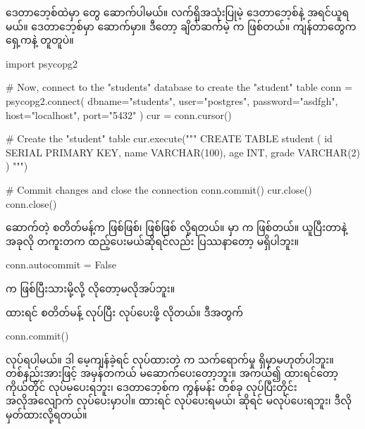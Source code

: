 ဒေတာဘေ့စ်ထဲမှာ  တွေ ဆောက်ပါမယ်။ လက်ရှိအသုံးပြုမဲ့ ဒေတာဘေ့စ်နဲ့  အရင်ယူရမယ်။  ဒေတာဘေ့စ်မှာ   ဆောက်မှာ။ ဒီတော့ ချိတ်ဆက်မဲ့  က  ဖြစ်တယ်။ ကျန်တာတွေက ရှေ့ကနဲ့ တူတူပဲ။
%
\begin{py}
import psycopg2

# Now, connect to the "students" database to create the "student" table
conn = psycopg2.connect(
    dbname="students",
    user="postgres",
    password="asdfgh",
    host="localhost",
    port="5432"
)
cur = conn.cursor()

# Create the "student" table
cur.execute("""
    CREATE TABLE student (
        id SERIAL PRIMARY KEY,
        name VARCHAR(100),
        age INT,
        grade VARCHAR(2)
    )
""")

# Commit changes and close the connection
conn.commit()
cur.close()
conn.close()
\end{py}
%

 ဆောက်တဲ့  စတိတ်မန့်က    ဖြစ်ဖြစ်၊  ဖြစ်ဖြစ်  လို့ရတယ်။  မှာ  က  ဖြစ်တယ်။  ယူပြီးတာနဲ့ အခုလို တကူးတက ထည့်ပေးမယ်ဆိုရင်လည်း ပြဿနာတော့ မရှိပါဘူး။ 
%
\begin{py}
conn.autocommit = False
\end{py}
%
 က  ဖြစ်ပြီးသားမို့လို့ လိုတော့မလိုအပ်ဘူး။

  ထားရင်  စတိတ်မန့်  လုပ်ပြီး  လုပ်ပေးဖို့ လိုတယ်။ ဒီအတွက်
%
\begin{py}
conn.commit()
\end{py}
%
လုပ်ရပါမယ်။ ဒါ မေ့ကျန်ခဲ့ရင်  လုပ်ထားတဲ့  က သက်ရောက်မှု ရှိမှာမဟုတ်ပါဘူး။ တစ်နည်းအားဖြင့်  အမှန်တကယ် မဆောက်ပေးတော့ဘူး။ အကယ်၍   ထားရင်တော့ ကိုယ်တိုင်  လုပ်မပေးရဘူး၊ ဒေတာဘေ့စ်က  ကွန်မန်း တစ်ခု  လုပ်ပြီးတိုင်း အလိုအလျောက်  လုပ်ပေးမှာပါ။  ထားရင်  လုပ်ပေးရမယ်၊  ဆိုရင် မလုပ်ပေးရဘူး၊ ဒီလို မှတ်ထားလို့ရတယ်။


